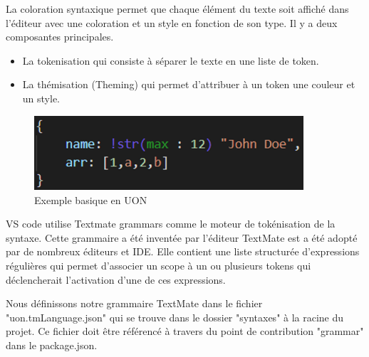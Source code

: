 \documentclass[
    iict, %
    il, %
]{heig-tb}
\begin{document}

La coloration syntaxique permet que chaque élément du texte soit affiché dans l'éditeur avec une coloration et un style en fonction de son type.
Il y a deux composantes principales. %
\begin{itemize}
    \item La tokenisation qui consiste à séparer le texte en une liste de token.
    \item La thémisation (Theming) qui permet d'attribuer à un token une couleur et un style.
\end{itemize}

\begin{figure}[!h]
    \begin{center}
        \includegraphics[width=10cm]{assets/figures/basic-uon.png}
    \end{center}
    \caption[code UON]{\label{basic-uon} Exemple basique en UON}
\end{figure}


VS code utilise Textmate grammars \cite{textmate-grammars} comme le moteur de tokénisation de la syntaxe.
Cette grammaire a été inventée par l'éditeur TextMate est a été adopté par de nombreux éditeurs et IDE.
Elle contient une liste structurée d'expressions régulières qui permet d'associer un scope
à un ou plusieurs tokens qui déclencherait l'activation d'une de ces expressions.

Nous définissons notre grammaire TextMate dans le fichier "uon.tmLanguage.json" qui se trouve dans le dossier "syntaxes" à la racine du projet.
Ce fichier doit être référencé à travers du point de contribution "grammar" dans le package.json.


\end{document}
